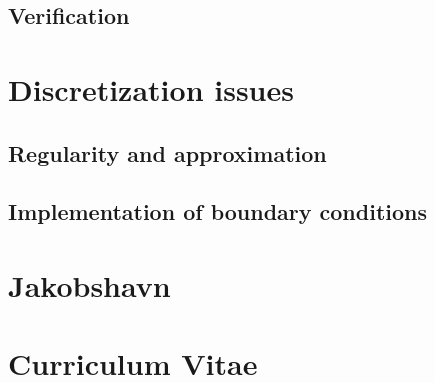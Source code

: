 \documentclass[a4paper,twoside,11pt,pdftex]{report}
\begin{document}
\section{Verification}\label{sec:verification}


\cleardoublepage
\chapter{Discretization issues}\label{chap:discretization}
\section{Regularity and approximation}\label{sec:regularity}


\section{Implementation of boundary conditions}\label{sec:slip}


\cleardoublepage
% 

% 

\chapter{Jakobshavn}\label{chap:jakobshavn}

\cleardoublepage



\cleardoublepage

\appendix

\pagestyle{plain}
\chapter*{Curriculum Vitae}
\end{document}
